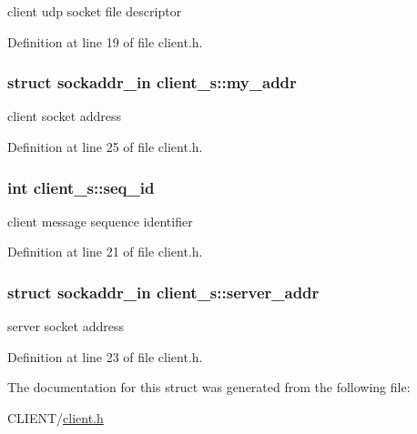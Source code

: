 client udp socket file descriptor 



Definition at line 19 of file client.\-h.

\hypertarget{structclient__s_a618e45173f1bb6920a8c9afe885e16be}{
\subsubsection[{my\-\_\-addr}]{\setlength{\rightskip}{0pt plus 5cm}struct sockaddr\-\_\-in client\-\_\-s\-::my\-\_\-addr}}\label{structclient__s_a618e45173f1bb6920a8c9afe885e16be}


client socket address 



Definition at line 25 of file client.\-h.

\hypertarget{structclient__s_aa10e2d632839fa347fd9835f8a41a694}{
\subsubsection[{seq\-\_\-id}]{\setlength{\rightskip}{0pt plus 5cm}int client\-\_\-s\-::seq\-\_\-id}}\label{structclient__s_aa10e2d632839fa347fd9835f8a41a694}


client message sequence identifier 



Definition at line 21 of file client.\-h.

\hypertarget{structclient__s_a4cb8f28435762b205424d16ea39dcab3}{
\subsubsection[{server\-\_\-addr}]{\setlength{\rightskip}{0pt plus 5cm}struct sockaddr\-\_\-in client\-\_\-s\-::server\-\_\-addr}}\label{structclient__s_a4cb8f28435762b205424d16ea39dcab3}


server socket address 



Definition at line 23 of file client.\-h.



The documentation for this struct was generated from the following file\-:\begin{DoxyCompactItemize}
\item 
C\-L\-I\-E\-N\-T/\hyperlink{client_8h}{client.\-h}\end{DoxyCompactItemize}
